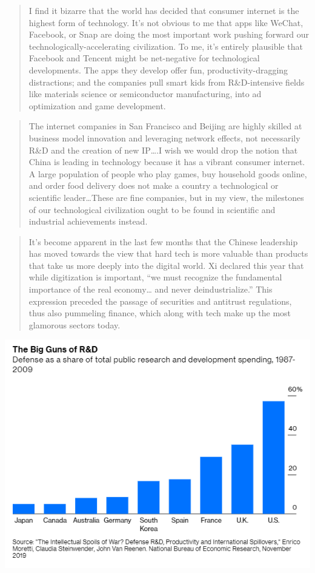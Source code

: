 \documentclass[
]{book}
\begin{document}
\begin{quote}
I find it bizarre that the world has decided that consumer internet is the highest form of technology. It's not obvious to me that apps like WeChat, Facebook, or Snap are doing the most important work pushing forward our technologically-accelerating civilization. To me, it's entirely plausible that Facebook and Tencent might be net-negative for technological developments. The apps they develop offer fun, productivity-dragging distractions; and the companies pull smart kids from R\&D-intensive fields like materials science or semiconductor manufacturing, into ad optimization and game development.
\end{quote}

\begin{quote}
The internet companies in San Francisco and Beijing are highly skilled at business model innovation and leveraging network effects, not necessarily R\&D and the creation of new IP\ldots.I wish we would drop the notion that China is leading in technology because it has a vibrant consumer internet. A large population of people who play games, buy household goods online, and order food delivery does not make a country a technological or scientific leader\ldots These are fine companies, but in my view, the milestones of our technological civilization ought to be found in scientific and industrial achievements instead.
\end{quote}

\begin{quote}
It's become apparent in the last few months that the Chinese leadership has moved towards the view that hard tech is more valuable than products that take us more deeply into the digital world. Xi declared this year that while digitization is important, ``we must recognize the fundamental importance of the real economy\ldots{} and never deindustrialize.'' This expression preceded the passage of securities and antitrust regulations, thus also pummeling finance, which along with tech make up the most glamorous sectors today.
\end{quote}

\includegraphics{fig/RD_Military_Share.png}
\end{document}
